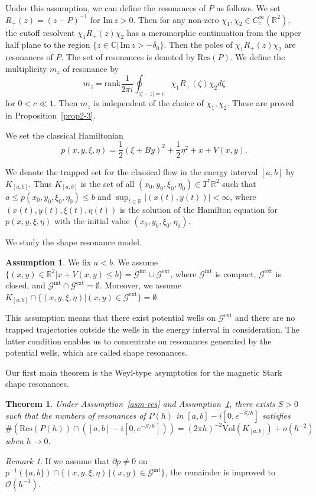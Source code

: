 \documentclass{article}
\theoremstyle{plain}
\newtheorem{thm}{Theorem}
\theoremstyle{definition}
\newtheorem{asm}{Assumption}
\theoremstyle{remark}
\newtheorem{remark}[prop]{Remark}
\newcommand{\RR}{\mathbb{R}}
\newcommand{\CC}{\mathbb{C}}
\newcommand{\Cinf}{C^{\infty}}
\newcommand{\IM}{\mathrm{Im}\,}
\begin{document}
Under this assumption, we can define the resonances of $P$ as follows.  
We set $R_{+}(z)=(z-P)^{-1}$ for $\IM z>0$.
Then for any non-zero $\chi_1, \chi_2\in \Cinf_c(\RR^2)$, the cutoff resolvent $\chi_1 R_{+}(z)\chi_2$ has 
a meromorphic continuation from the upper half plane to the region 
$\{z\in \CC|\, \IM z>-\delta_0\}$. Then the poles of $\chi_1 R_{+}(z)\chi_2$ are resonances of $P$. 
The set of resonances is denoted by $\mathrm{Res}(P)$.  
We define the multiplicity $m_z$ of resonance by
\[
m_z=\mathrm{rank}\frac{1}{2\pi i}\oint_{|\zeta-z|=c} \chi_1 R_+(\zeta) \chi_2 d\zeta 
\]
for $0<c\ll 1$. Then $m_z$ is independent of the choice of $\chi_1, \chi_2$. 
These are proved in Proposition~\ref{prop2-3}.  


We set the classical Hamiltonian 
\[
p(x, y, \xi, \eta)=\frac{1}{2}(\xi+By)^2+\frac{1}{2}\eta^2+x+V(x, y). 
\]

We denote the trapped set for the classical flow in the energy interval $[a,b]$ by $K_{[a,b]}$.
Thus $K_{[a,b]}$ is the set of all $(x_0, y_0, \xi_0, \eta_0)\in T^*\RR^2$ 
such that $a\le p(x_0, y_0, \xi_0, \eta_0)\le b$ and $\sup_{t\in \RR}|(x(t), y(t))|<\infty$, 
where $(x(t), y(t), \xi(t), \eta(t))$ is the solution of the Hamilton equation for 
$p(x, y, \xi, \eta)$ with the initial value $(x_0, y_0, \xi_0, \eta_0)$.

We study the shape resonance model. 
\begin{asm}\label{asm-shape}
We fix $a<b$. We assume $\{(x,y) \in \RR^2|x+V(x, y)\le b\}=\mathcal{G}^{\mathrm{int}}\cup\mathcal{G}^{\mathrm{ext}}$, 
where $\mathcal{G}^{\mathrm{int}}$ is compact, 
$\mathcal{G}^{\mathrm{ext}}$ is closed, and $\mathcal{G}^{\mathrm{int}}\cap\mathcal{G}^{\mathrm{ext}}=\emptyset$. 
Moreover, we assume 
$K_{[a,b]}\cap\{(x, y, \xi, \eta)|(x, y)\in \mathcal{G}^{\mathrm{ext}}\}=\emptyset$.
\end{asm}
This assumption means that there exist potential wells on $\mathcal{G}^{\mathrm{ext}}$ and 
there are no trapped trajectories outside the wells in the energy interval in consideration. 
The latter condition enables us to concentrate on resonances generated by the potential wells, 
which are called shape resonances.  

Our first main theorem is the Weyl-type asymptotics for the magnetic Stark shape resonances.  
\begin{thm}\label{thm-1}
Under Assumption~\ref{asm-res} and Assumption~\ref{asm-shape}, there exists $S>0$ such that 
the numbers of resonances of $P(h)$ in $[a, b]-i[0, e^{-S/h}]$ satisfies 
\[
\#\left(\mathrm{Res}(P(h))\cap ([a, b]-i[0, e^{-S/h}])\right)
=(2\pi h)^{-2} \mathrm{Vol}(K_{[a,b]})+o(h^{-2})
\]
when $h \to 0$.  
\end{thm}
\begin{remark}\label{rem-sharp}
If we assume that $\partial p\not=0$ on 
$p^{-1}(\{a, b\})\cap \{(x, y, \xi, \eta)\,|(x, y)\in \mathcal{G}^{\mathrm{int}}\}$, 
the remainder is improved to $\mathcal{O}(h^{-1})$. 
\end{remark}
\end{document}

